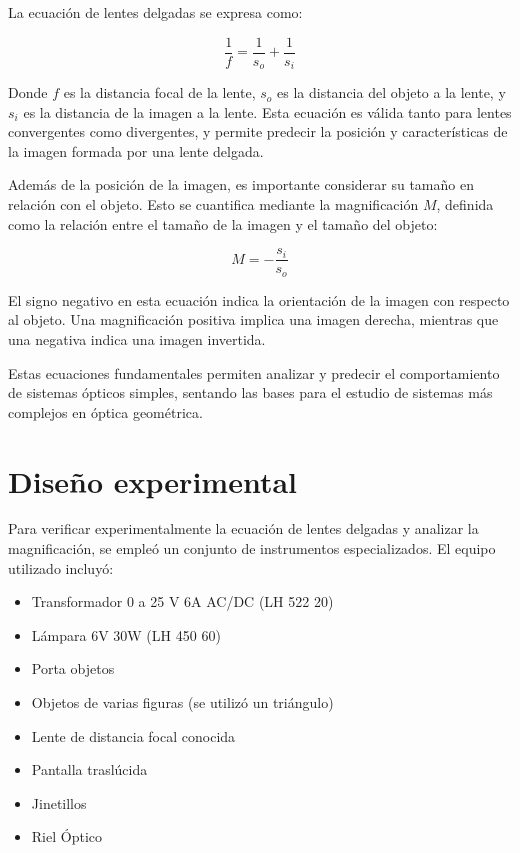 \documentclass[twocolumn,a4paper,11pt]{scrartcl}
\begin{document}
La ecuación de lentes delgadas se expresa como:

\begin{equation}
\frac{1}{f} = \frac{1}{s_o} + \frac{1}{s_i}
\end{equation}

Donde $f$ es la distancia focal de la lente, $s_o$ es la distancia del objeto a la lente, y $s_i$ es la distancia de la imagen a la lente. Esta ecuación es válida tanto para lentes convergentes como divergentes, y permite predecir la posición y características de la imagen formada por una lente delgada.

Además de la posición de la imagen, es importante considerar su tamaño en relación con el objeto. Esto se cuantifica mediante la magnificación $M$, definida como la relación entre el tamaño de la imagen y el tamaño del objeto:

\begin{equation}
M = -\frac{s_i}{s_o}
\end{equation}

El signo negativo en esta ecuación indica la orientación de la imagen con respecto al objeto. Una magnificación positiva implica una imagen derecha, mientras que una negativa indica una imagen invertida.

Estas ecuaciones fundamentales permiten analizar y predecir el comportamiento de sistemas ópticos simples, sentando las bases para el estudio de sistemas más complejos en óptica geométrica.

\section{Diseño experimental}
Para verificar experimentalmente la ecuación de lentes delgadas y analizar la magnificación, se empleó un conjunto de instrumentos especializados. El equipo utilizado incluyó:

\begin{itemize}
    \item Transformador 0 a 25 V 6A AC/DC (LH 522 20)
    \item Lámpara 6V 30W (LH 450 60)
    \item Porta objetos
    \item Objetos de varias figuras (se utilizó un triángulo)
    \item Lente de distancia focal conocida
    \item Pantalla traslúcida
    \item Jinetillos
    \item Riel Óptico
\end{itemize}
\end{document}
